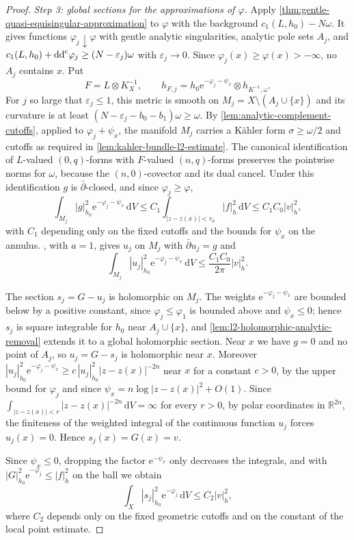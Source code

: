 \begin{proof}
\emph{Step 3: global sections for the approximations of $\varphi$.} Apply \cref{thm:gentle-quasi-equisingular-approximation} to $\varphi$ with the background $c_1(L,h_0)-N\omega$. It gives functions $\varphi_j\downarrow\varphi$ with gentle analytic singularities, analytic pole sets $A_j$, and $c_1(L,h_0)+\mathrm{dd}^{\mathrm{c}}\varphi_j\geq(N-\varepsilon_j)\omega$ with $\varepsilon_j\to0$. Since $\varphi_j(x)\geq\varphi(x)>-\infty$, no $A_j$ contains $x$. Put
\[
 F=L\otimes K_X^{-1},\qquad
 h_{F,j}=h_0\mathrm e^{-\varphi_j-\psi_x}\otimes h_{K^{-1},\omega}.
\]
For $j$ so large that $\varepsilon_j\leq1$, this metric is smooth on $M_j=X\setminus(A_j\cup\{x\})$ and its curvature is at least $(N-\varepsilon_j-b_0-b_1)\omega\geq\omega$. By \cref{lem:analytic-complement-cutoffs}, applied to $\varphi_j+\psi_x$, the manifold $M_j$ carries a K\"ahler form $\sigma\geq\omega/2$ and cutoffs as required in \cref{lem:kahler-bundle-l2-estimate}. The canonical identification of $L$-valued $(0,q)$-forms with $F$-valued $(n,q)$-forms preserves the pointwise norms for $\omega$, because the $(n,0)$-covector and its dual cancel. Under this identification $g$ is $\bar\partial$-closed, and since $\varphi_j\geq\varphi$,
\[
 \int_{M_j}|g|_{h_0}^2\mathrm e^{-\varphi_j-\psi_x}\,\mathrm dV
 \leq C_1\int_{|z-z(x)|<r_0}|f|_h^2\,\mathrm dV
 \leq C_1C_0|v|_h^2,
\]
with $C_1$ depending only on the fixed cutoffs and the bounds for $\psi_x$ on the annulus. , with $a=1$, gives $u_j$ on $M_j$ with $\bar\partial u_j=g$ and
\[
 \int_{M_j}|u_j|_{h_0}^2\mathrm e^{-\varphi_j-\psi_x}\,\mathrm dV\leq\frac{C_1C_0}{2\pi}|v|_h^2.
\]

The section $s_j=G-u_j$ is holomorphic on $M_j$. The weights $\mathrm e^{-\varphi_j-\psi_x}$ are bounded below by a positive constant, since $\varphi_j\leq\varphi_1$ is bounded above and $\psi_x\leq0$; hence $s_j$ is square integrable for $h_0$ near $A_j\cup\{x\}$, and \cref{lem:l2-holomorphic-analytic-removal} extends it to a global holomorphic section. Near $x$ we have $g=0$ and no point of $A_j$, so $u_j=G-s_j$ is holomorphic near $x$. Moreover $|u_j|_{h_0}^2\mathrm e^{-\varphi_j-\psi_x}\geq c\,|u_j|_{h_0}^2|z-z(x)|^{-2n}$ near $x$ for a constant $c>0$, by the upper bound for $\varphi_j$ and since $\psi_x=n\log|z-z(x)|^2+O(1)$. Since $\int_{|z-z(x)|<r}|z-z(x)|^{-2n}\,\mathrm dV=\infty$ for every $r>0$, by polar coordinates in $\mathbb R^{2n}$, the finiteness of the weighted integral of the continuous function $u_j$ forces $u_j(x)=0$. Hence $s_j(x)=G(x)=v$.

Since $\psi_x\leq0$, dropping the factor $\mathrm e^{-\psi_x}$ only decreases the integrals, and with $|G|_{h_0}^2\mathrm e^{-\varphi_j}\leq|f|_h^2$ on the ball we obtain
\[
 \int_X|s_j|_{h_0}^2\mathrm e^{-\varphi_j}\,\mathrm dV
 \leq C_2|v|_h^2,
\]
where $C_2$ depends only on the fixed geometric cutoffs and on the constant of the local point estimate.


\end{proof}
